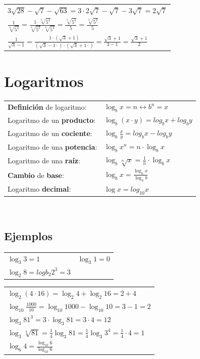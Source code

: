 \documentclass[a4paper,spanish,9pt]{extarticle}
\begin{document}
\begin{multicols*}{2}
\begin{tabular}{l}
$3\sqrt{28}-\sqrt{7}-\sqrt{63}=3\cdot 2\sqrt{7}-\sqrt{7}-3\sqrt{7}=2\sqrt{7}$ \\
$\frac{1}{\sqrt[6]{5^2}}=\frac{1\cdot \sqrt[6]{5^4}}{\sqrt[6]{5^2}\cdot \sqrt[6]{5^4}}=\frac{\sqrt[6]{5^4}}{5}=\frac{\sqrt[3]{5^2}}{5}$  \\
$\frac{1}{\sqrt{3}-1}=\frac{1 \cdot \left(\sqrt{3}+1\right)}{\left(\sqrt{3}-1 \cdot \right)\cdot \left(\sqrt{3}+1\cdot \right)}=\frac{\sqrt{3}+1}{3-1}=\frac{\sqrt{3}+1}{2}$
\end{tabular}

\section{Logaritmos}

\begin{tabular}{ll}
\textbf{Definición} de logaritmo: & $\log_b x = n \longleftrightarrow b^n=x$\\
Logaritmo de un \textbf{producto}: & $\log_b \left(x\cdot y\right)=log_b x + log_b y$\\
Logaritmo de un \textbf{cociente}: & $\log_b \frac{x}{y}=log_b x - log_b y$\\
Logaritmo de una \textbf{potencia}: & $\log_b {x^n} = n \cdot \log_b x$\\
Logaritmo de una \textbf{raíz}: & $\log_b {\sqrt[n]{x}} = \frac{1}{n} \cdot \log_b x$\\
\textbf{Cambio} de \textbf{base}: & $\log_b x =\frac{\log_a x}{\log_a b}$\\
Logaritmo \textbf{decimal}: & $\log x = log_{10} x$
\end{tabular}\\

\subsection{Ejemplos}

\begin{tabular}{ll}
$\log_3 3 = 1$ & $\log_3 1 = 0$ \\
$\log_2 8 = logb_2 2^3 = 3$  
\end{tabular}

\begin{tabular}{l}
$\log_2 \left(4\cdot 16\right)=\log_2 4 + \log_2 16=2 + 4$  \\
$\log_{10}\frac{1000}{10} =\log_{10} 1000 - \log_{10} 10 = 3-1=2 $ \\
$\log_3 {81^3} = 3 \cdot \log_3 81= 3 \cdot 4= 12$ \\
$\log_3 {\sqrt[4]{81}} = \frac{1}{4} \log_3 81=\frac{1}{4} \log_3 3^4= \frac{1}{4} \cdot 4= 1$ \\
$\log_6 4 =\frac{\log_{10} 6}{\log_{10} 6}$
\end{tabular}



%
%




\end{multicols*}
\end{document}
